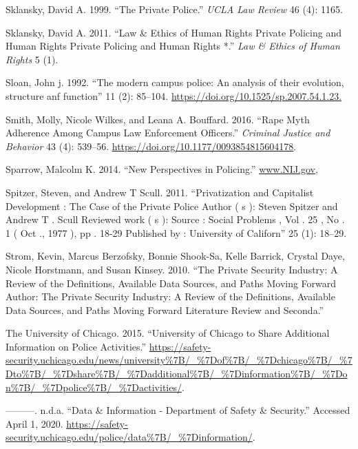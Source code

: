 \documentclass{ucetd}
\begin{document}
\leavevmode\hypertarget{ref-Sklansky1999}{}%
Sklansky, David A. 1999. ``The Private Police.'' \emph{UCLA Law Review}
46 (4): 1165.

\leavevmode\hypertarget{ref-Sklansky2011}{}%
Sklansky, David A. 2011. ``Law \& Ethics of Human Rights Private
Policing and Human Rights Private Policing and Human Rights *.''
\emph{Law \& Ethics of Human Rights} 5 (1).

\leavevmode\hypertarget{ref-Sloan1992}{}%
Sloan, John j. 1992. ``The modern campus police: An analysis of their
evolution, structure anf function'' 11 (2): 85--104.
\url{https://doi.org/10.1525/sp.2007.54.1.23.}

\leavevmode\hypertarget{ref-Smith2016}{}%
Smith, Molly, Nicole Wilkes, and Leana A. Bouffard. 2016. ``Rape Myth
Adherence Among Campus Law Enforcement Officers.'' \emph{Criminal
Justice and Behavior} 43 (4): 539--56.
\url{https://doi.org/10.1177/0093854815604178}.

\leavevmode\hypertarget{ref-Sparrow2014}{}%
Sparrow, Malcolm K. 2014. ``New Perspectives in Policing.''
\url{www.NIJ.gov,}

\leavevmode\hypertarget{ref-Spitzer2011}{}%
Spitzer, Steven, and Andrew T Scull. 2011. ``Privatization and
Capitalist Development : The Case of the Private Police Author ( s ):
Steven Spitzer and Andrew T . Scull Reviewed work ( s ): Source : Social
Problems , Vol . 25 , No . 1 ( Oct ., 1977 ), pp . 18-29 Published by :
University of Californ'' 25 (1): 18--29.

\leavevmode\hypertarget{ref-Strom2010}{}%
Strom, Kevin, Marcus Berzofsky, Bonnie Shook-Sa, Kelle Barrick, Crystal
Daye, Nicole Horstmann, and Susan Kinsey. 2010. ``The Private Security
Industry: A Review of the Definitions, Available Data Sources, and Paths
Moving Forward Author: The Private Security Industry: A Review of the
Definitions, Available Data Sources, and Paths Moving Forward Literature
Review and Seconda.''

\leavevmode\hypertarget{ref-TheUniversityofChicago2015}{}%
The University of Chicago. 2015. ``University of Chicago to Share
Additional Information on Police Activities.''
\url{https://safety-security.uchicago.edu/news/university\%7B/_\%7Dof\%7B/_\%7Dchicago\%7B/_\%7Dto\%7B/_\%7Dshare\%7B/_\%7Dadditional\%7B/_\%7Dinformation\%7B/_\%7Don\%7B/_\%7Dpolice\%7B/_\%7Dactivities/}.

\leavevmode\hypertarget{ref-TheUniversityofChicagob}{}%
---------. n.d.a. ``Data \& Information - Department of Safety \&
Security.'' Accessed April 1, 2020.
\url{https://safety-security.uchicago.edu/police/data\%7B/_\%7Dinformation/}.
\end{document}
